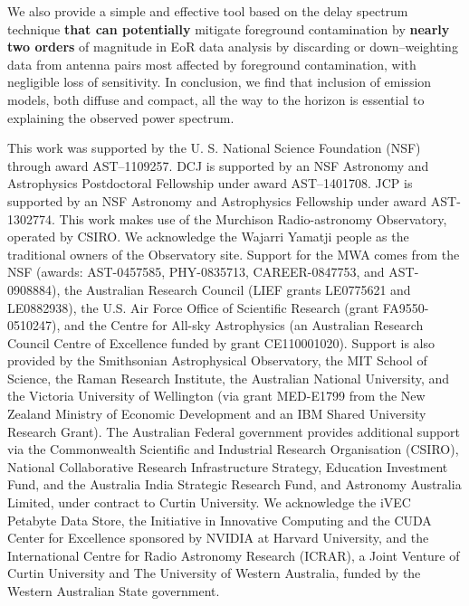 \documentclass[preprint2,iop,numberedappendix]{emulateapj}
\begin{document}
We also provide a simple and effective tool based on the delay spectrum technique {\bf that can potentially} mitigate foreground contamination by {\bf nearly two orders} of magnitude in EoR data analysis by discarding or down--weighting data from antenna pairs most affected by foreground contamination, with negligible loss of sensitivity. In conclusion, we find that inclusion of emission models, both diffuse and compact, all the way to the horizon is essential to explaining the observed power spectrum. 

\acknowledgments

This work was supported by the U. S. National Science Foundation (NSF) through award AST--1109257. DCJ is supported by an NSF Astronomy and Astrophysics Postdoctoral Fellowship under award AST--1401708. JCP is supported by an NSF Astronomy and Astrophysics Fellowship under award AST-1302774. This work makes use of the Murchison Radio-astronomy Observatory, operated by CSIRO. We acknowledge the Wajarri Yamatji people as the traditional owners of the Observatory site. Support for the MWA comes from the NSF (awards: AST-0457585, PHY-0835713, CAREER-0847753, and AST-0908884), the Australian Research Council (LIEF grants LE0775621 and LE0882938), the U.S. Air Force Office of Scientific Research (grant FA9550-0510247), and the Centre for All-sky Astrophysics (an Australian Research Council Centre of Excellence funded by grant CE110001020). Support is also provided by the Smithsonian Astrophysical Observatory, the MIT School of Science, the Raman Research Institute, the Australian National University, and the Victoria University of Wellington (via grant MED-E1799 from the New Zealand Ministry of Economic Development and an IBM Shared University Research Grant). The Australian Federal government provides additional support via the Commonwealth Scientific and Industrial Research Organisation (CSIRO), National Collaborative Research Infrastructure Strategy, Education Investment Fund, and the Australia India Strategic Research Fund, and Astronomy Australia Limited, under contract to Curtin University. We acknowledge the iVEC Petabyte Data Store, the Initiative in Innovative Computing and the CUDA Center for Excellence sponsored by NVIDIA at Harvard University, and the International Centre for Radio Astronomy Research (ICRAR), a Joint Venture of Curtin University and The University of Western Australia, funded by the Western Australian State government.  



\end{document}
